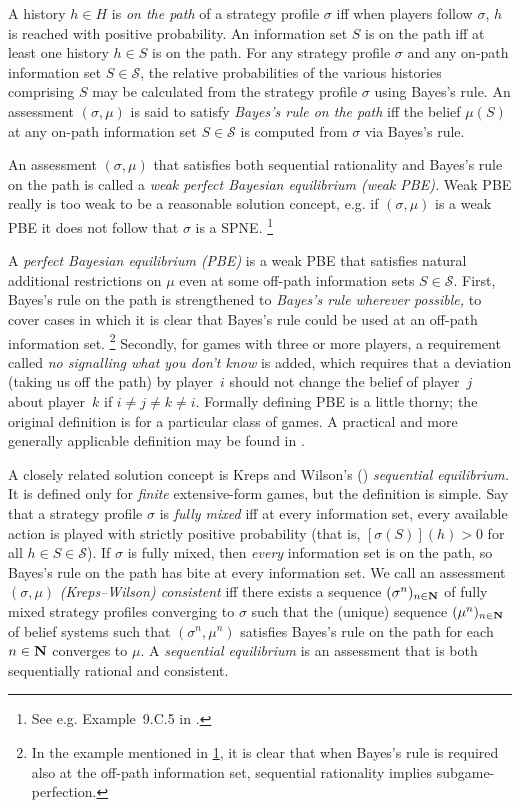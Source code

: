\documentclass[11pt,letterpaper,reqno,oneside]{book}
\begin{document}
A history $h \in H$ is \emph{on the path} of a strategy profile $\sigma$ iff when players follow $\sigma$, $h$ is reached with positive probability. An information set $S$ is on the path iff at least one history $h \in S$ is on the path. For any strategy profile $\sigma$ and any on-path information set $S \in \mathcal{S}$, the relative probabilities of the various histories comprising $S$ may be calculated from the strategy profile $\sigma$ using Bayes's rule. An assessment $(\sigma,\mu)$ is said to satisfy \emph{Bayes's rule on the path} iff the belief $\mu(S)$ at any on-path information set $S \in \mathcal{S}$ is computed from $\sigma$ via Bayes's rule.

An assessment $(\sigma,\mu)$ that satisfies both sequential rationality and Bayes's rule on the path is called a \emph{weak perfect Bayesian equilibrium (weak PBE).} Weak PBE really is too weak to be a reasonable solution concept, e.g. if $(\sigma,\mu)$ is a weak PBE it does not follow that $\sigma$ is a SPNE.%
	\footnote{\label{footnote:wpbe_spne}See e.g. Example~9.C.5 in \textcite[][p.~289]{MascolellWhinstonGreen1995}.}

A \emph{perfect Bayesian equilibrium (PBE)} is a weak PBE that satisfies natural additional restrictions on $\mu$ even at some off-path information sets $S \in \mathcal{S}$. First, Bayes's rule on the path is strengthened to \emph{Bayes's rule wherever possible,} to cover cases in which it is clear that Bayes's rule could be used at an off-path information set.%
	\footnote{In the example mentioned in \cref{footnote:wpbe_spne}, it is clear that when Bayes's rule is required also at the off-path information set, sequential rationality implies subgame-perfection.}
Secondly, for games with three or more players, a requirement called \emph{no signalling what you don't know} is added, which requires that a deviation (taking us off the path) by player~$i$ should not change the belief of player~$j$ about player~$k$ if $i \neq j \neq k \neq i$.
Formally defining PBE is a little thorny; the original definition \parencite{FudenbergTirole1991} is for a particular class of games. A practical and more generally applicable definition may be found in \textcite{Watson2025}.

A closely related solution concept is Kreps and Wilson's (\citeyear{KrepsWilson1982}) \emph{sequential equilibrium.} It is defined only for \emph{finite} extensive-form games, but the definition is simple. Say that a strategy profile $\sigma$ is \emph{fully mixed} iff at every information set, every available action is played with strictly positive probability (that is, $[\sigma(S)](h) > 0$ for all $h \in S \in \mathcal{S}$). If $\sigma$ is fully mixed, then \emph{every} information set is on the path, so Bayes's rule on the path has bite at every information set. We call an assessment $(\sigma,\mu)$ \emph{(Kreps--Wilson) consistent} iff there exists a sequence $(\sigma^n)_{n \in \mathbf{N}}$ of fully mixed strategy profiles converging to $\sigma$ such that the (unique) sequence $(\mu^n)_{n \in \mathbf{N}}$ of belief systems such that $(\sigma^n,\mu^n)$ satisfies Bayes's rule on the path for each $n \in \mathbf{N}$ converges to $\mu$. A \emph{sequential equilibrium} is an assessment that is both sequentially rational and consistent.
\end{document}
